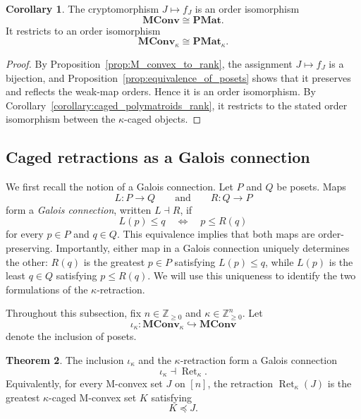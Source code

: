 \documentclass[11pt]{article}
\theoremstyle{definition}
\newtheorem{theorem}{Theorem}[section]
\newtheorem{corollary}[theorem]{Corollary}
\theoremstyle{remark}
\newcommand{\Zgeq}{\mathbb{Z}_{\geq 0}}       %
\newcommand{\Zgeqn}{\mathbb{Z}_{\geq 0}^n}     %
\newcommand{\PMat}{\mathbf{PMat}}      %
\newcommand{\MConv}{\mathbf{MConv}}    %
\newcommand{\PMatK}{\mathbf{PMat}_\kappa}
\newcommand{\MConvK}{\mathbf{MConv}_\kappa}
\DeclareMathOperator{\Ret}{Ret}                %
\newcommand{\RetK}{\Ret_{\kappa}}              %
\begin{document}
\begin{corollary}\label{corr:equivalence_of_posets}
    The cryptomorphism $J\mapsto f_J$ is an order isomorphism
    \[
        \MConv\cong\PMat.
    \]
    It restricts to an order isomorphism
    \[
        \MConvK\cong\PMatK.
    \]
\end{corollary}

\begin{proof}
    By Proposition~\ref{prop:M_convex_to_rank}, the assignment
    $J\mapsto f_J$ is a bijection, and
    Proposition~\ref{prop:equivalence_of_posets} shows that it preserves
    and reflects the weak-map orders. Hence it is an order isomorphism.
    By Corollary~\ref{corollary:caged_polymatroids_rank}, it restricts to the
    stated order isomorphism between the $\kappa$-caged objects.
\end{proof}

\subsection{Caged retractions as a Galois connection}

We first recall the notion of a Galois connection. Let $P$ and $Q$ be
posets. Maps
\[
    L\colon P\longrightarrow Q
    \qquad\text{and}\qquad
    R\colon Q\longrightarrow P
\]
form a \emph{Galois connection}, written $L\dashv R$, if
\[
    L(p)\leq q
    \quad\Longleftrightarrow\quad
    p\leq R(q)
\]
for every $p\in P$ and $q\in Q$. This equivalence implies that both maps
are order-preserving. Importantly, either map in a Galois connection
uniquely determines the other: $R(q)$ is the greatest $p\in P$ satisfying
$L(p)\leq q$, while $L(p)$ is the least $q\in Q$ satisfying
$p\leq R(q)$. We will use this uniqueness to identify the two formulations
of the $\kappa$-retraction.

Throughout this subsection, fix $n\in\Zgeq$ and
$\kappa\in\Zgeqn$. Let
\[
    \iota_\kappa\colon\MConvK\hookrightarrow\MConv
\]
denote the inclusion of posets.

\begin{theorem}\label{thm:reflection_as_M_convex}
    The inclusion $\iota_\kappa$ and the $\kappa$-retraction form a Galois
    connection
    \[
        \iota_\kappa\dashv\RetK.
    \]
    Equivalently, for every M-convex set $J$ on $[n]$, the retraction
    $\RetK(J)$ is the greatest $\kappa$-caged M-convex set $K$ satisfying
    \[
        K\preceq J.
    \]
\end{theorem}
\end{document}

